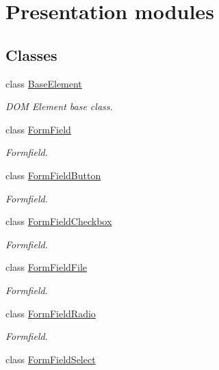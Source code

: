 \section{Presentation modules}
\label{group__OWL__UI__LAYER}
\subsection*{Classes}
\begin{DoxyCompactItemize}
\item 
class \hyperlink{classBaseElement}{BaseElement}
\begin{DoxyCompactList}\small\item\em DOM Element base class. \item\end{DoxyCompactList}\item 
class \hyperlink{classFormField}{FormField}
\begin{DoxyCompactList}\small\item\em Formfield. \item\end{DoxyCompactList}\item 
class \hyperlink{classFormFieldButton}{FormFieldButton}
\begin{DoxyCompactList}\small\item\em Formfield. \item\end{DoxyCompactList}\item 
class \hyperlink{classFormFieldCheckbox}{FormFieldCheckbox}
\begin{DoxyCompactList}\small\item\em Formfield. \item\end{DoxyCompactList}\item 
class \hyperlink{classFormFieldFile}{FormFieldFile}
\begin{DoxyCompactList}\small\item\em Formfield. \item\end{DoxyCompactList}\item 
class \hyperlink{classFormFieldRadio}{FormFieldRadio}
\begin{DoxyCompactList}\small\item\em Formfield. \item\end{DoxyCompactList}\item 
class \hyperlink{classFormFieldSelect}{FormFieldSelect}

\end{DoxyCompactItemize}
